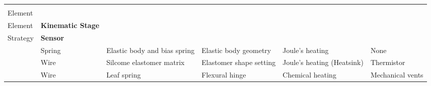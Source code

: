 \documentclass[border=1mm,
               class=article
               preview]{standalone}
\begin{document}
\renewcommand{\arraystretch}{1.5}
 {\footnotesize{}
\begin{tabular}{@{}p{}
                p{}
                p{}
                p{}
                p{}
                p{}@{}}
   \rowcolor{black}  & \textbf{\color{white} \parbox[t]{1.5cm}{Active\\Element}} & \textbf{\color{white} \parbox[t]{1.5cm}{Biasing\\Element}} & \textbf{\color{white} Kinematic Stage} & \textbf{\color{white} \parbox[t]{1.5cm}{Heating\\Strategy}} & \textbf{\color{white} Sensor}\\
   \cite{liangShapeMemoryAlloy2020} & Spring & Elastic body and bias spring & Elastic body geometry & Joule's heating & None\\
   \cite{huangHighlyDynamicShape2019} & Wire & Silcome elastomer matrix & Elastomer shape setting & Joule's heating (Heatsink) & Thermistor\\
   \cite{yang88milligramInsectscaleAutonomous2020a} & Wire & Leaf spring & Flexural hinge & Chemical heating & Mechanical vents\\
\end{tabular}}
\renewcommand{\arraystretch}{1}
\end{document}
